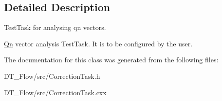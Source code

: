\subsection{Detailed Description}
Test\+Task for analysing qn vectors. 

\mbox{\hyperlink{namespaceQn}{Qn}} vector analysis Test\+Task. It is to be configured by the user. 

The documentation for this class was generated from the following files\+:\begin{DoxyCompactItemize}
\item 
D\+T\+\_\+\+Flow/src/Correction\+Task.\+h\item 
D\+T\+\_\+\+Flow/src/Correction\+Task.\+cxx\end{DoxyCompactItemize}
